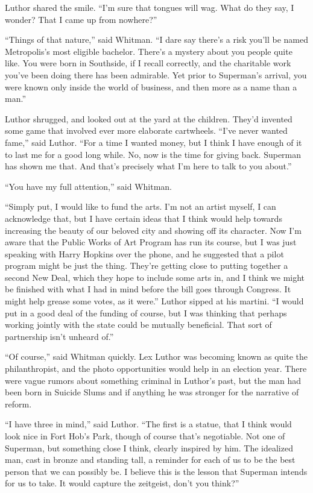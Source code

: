 \documentclass[ebook,12pt]{memoir}
\begin{document}
Luthor shared the smile. ``I'm sure that tongues will wag. What do they
say, I wonder? That I came up from nowhere?''

``Things of that nature,'' said Whitman. ``I dare say there's a risk
you'll be named Metropolis's most eligible bachelor. There's a mystery
about you people quite like. You were born in Southside, if I recall
correctly, and the charitable work you've been doing there has been
admirable. Yet prior to Superman's arrival, you were known only inside
the world of business, and then more as a name than a man.''

Luthor shrugged, and looked out at the yard at the children. They'd
invented some game that involved ever more elaborate cartwheels. ``I've
never wanted fame,'' said Luthor. ``For a time I wanted money, but I
think I have enough of it to last me for a good long while. No, now is
the time for giving back. Superman has shown me that. And that's
precisely what I'm here to talk to you about.''

``You have my full attention,'' said Whitman.

``Simply put, I would like to fund the arts. I'm not an artist myself, I
can acknowledge that, but I have certain ideas that I think would help
towards increasing the beauty of our beloved city and showing off its
character. Now I'm aware that the Public Works of Art Program has run
its course, but I was just speaking with Harry Hopkins over the phone,
and he suggested that a pilot program might be just the thing. They're
getting close to putting together a second New Deal, which they hope to
include some arts in, and I think we might be finished with what I had
in mind before the bill goes through Congress. It might help grease some
votes, as it were.'' Luthor sipped at his martini. ``I would put in a
good deal of the funding of course, but I was thinking that perhaps
working jointly with the state could be mutually beneficial. That sort
of partnership isn't unheard of.''

``Of course,'' said Whitman quickly. Lex Luthor was becoming known as
quite the philanthropist, and the photo opportunities would help in an
election year. There were vague rumors about something criminal in
Luthor's past, but the man had been born in Suicide Slums and if
anything he was stronger for the narrative of reform.

``I have three in mind,'' said Luthor. ``The first is a statue, that I
think would look nice in Fort Hob's Park, though of course that's
negotiable. Not one of Superman, but something close I think, clearly
inspired by him. The idealized man, cast in bronze and standing tall, a
reminder for each of us to be the best person that we can possibly be. I
believe this is the lesson that Superman intends for us to take. It
would capture the zeitgeist, don't you think?''
\end{document}
